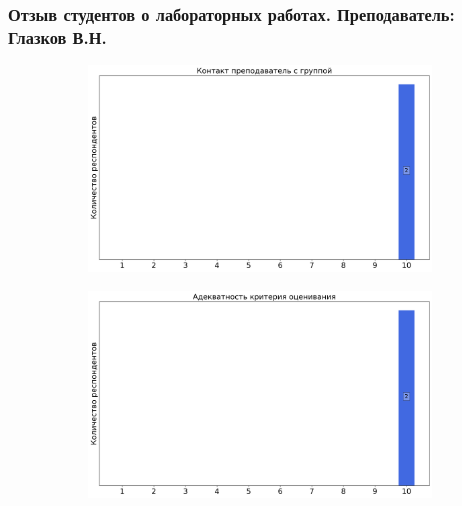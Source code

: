                 
        \subsubsection{Отзыв студентов о лабораторных работах. Преподаватель: Глазков В.Н.}
            \begin{figure}[H]
                \centering
                \begin{subfigure}[b]{0.45\textwidth}
                    \centering
                    \includegraphics[width=\textwidth]{images/3 course/Общая физика - квантовая физика/labniks-marks-Глазков В.Н.-0.png}
                \end{subfigure}
                \begin{subfigure}[b]{0.45\textwidth}
                    \centering
                    \includegraphics[width=\textwidth]{images/3 course/Общая физика - квантовая физика/labniks-marks-Глазков В.Н.-1.png}
                \end{subfigure}
                \begin{subfigure}[b]{0.45\textwidth}

\end{subfigure}
\end{figure}
